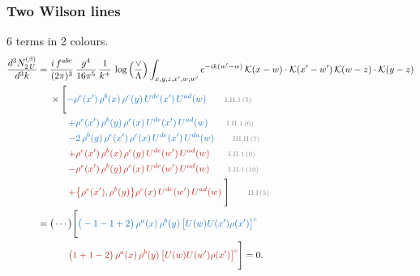 \documentclass[10pt]{article}
\begin{document}
\subsubsection{Two Wilson lines}
6 terms in 2 colours.
\begin{align}
\frac{d^{3}N^{(\beta)}_{2\,U}}{d^{3}k}={}&\frac{i\,f^{abc}}{(2\pi)^{3}}\,\frac{g^{4}}{16\pi^{5}}\,\frac{1}{k^{+}}\,\log\Big(\frac{\vee}{\Lambda}\Big)\int_{x,y,z,x',w,w'}e^{-ik(w'-w)}\,\mathcal{K}(x-w)\cdot\mathcal{K}(x'-w')\,\mathcal{K}(w-z)\cdot\mathcal{K}(y-z)\notag\\
&\times\Bigg[{\color{RoyalBlue}-\rho^{e}(x')\,\rho^{b}(x)\,\rho^{c}(y)\,U^{de}(x')\,U^{ad}(w)}\tag*{\color{gray}\scriptsize I.II.1\,(5)}\\
&\qquad{\color{RoyalBlue}+\rho^{e}(x')\,\rho^{b}(y)\,\rho^{c}(x)\,U^{de}(x')\,U^{ad}(w)}\tag*{\color{gray}\scriptsize I.II.1\,(6)}\\
&\qquad{\color{RoyalBlue}-2\,\rho^{b}(y)\,\rho^{e}(x')\, \rho^{c}(x)\, U^{de}(x')\,U^{da}(w)}\tag*{\color{gray}\scriptsize III.II\,(7)}\\
&\qquad{\color{BrickRed}+\rho^{e}(x')\,\rho^{b}(x)\,\rho^{c}(y)\,U^{de}(w')\,U^{ad}(w)}\tag*{\color{gray}\scriptsize I.II.1\,(9)}\\
&\qquad{\color{BrickRed}-\rho^{e}(x')\,\rho^{b}(y)\,\rho^{c}(x)\,U^{de}(w')\,U^{ad}(w)}\tag*{\color{gray}\scriptsize I.II.1\,(10)}\\
&\qquad{\color{BrickRed}+\big\{\rho^{e}(x'),\rho^{b}(y)\big\}\rho^{c}(x)\,U^{de}(w')\,U^{ad}(w)}\;\Bigg]\tag*{\color{gray}\scriptsize II.I\,(5)}\\
={}&\big(\cdots\big)\Bigg[{\color{RoyalBlue}\big(-1-1+2\big)\,\rho^{a}(x)\,\rho^{b}(y)\,\big[U(w)U(x')\rho(x')\big]^{c}}\notag\\
&\qquad{\color{BrickRed}\big(1+1-2\big)\,\rho^{a}(x)\,\rho^{b}(y)\,\big[U(w)U(w')\rho(x')\big]^{c}}\Bigg]=0.
\end{align}
\end{document}

